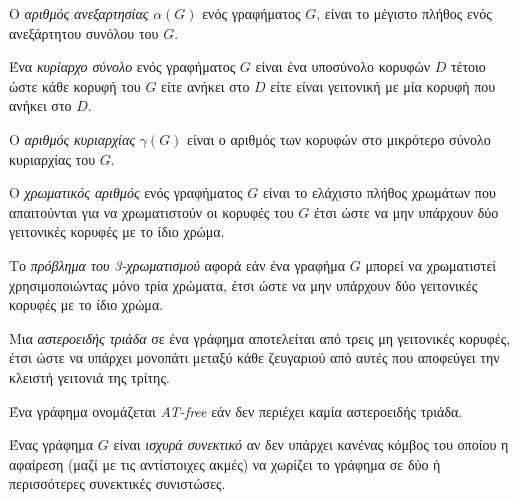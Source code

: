 \begin{definition}
	Ο \textit{αριθμός ανεξαρτησίας} $\alpha(G)$ ενός γραφήματος $G$, είναι το μέγιστο πλήθος ενός ανεξάρτητου συνόλου του $G$.
\end{definition}

\begin{definition}
	Ένα \textit{κυρίαρχο σύνολο} ενός γραφήματος $G$ είναι ένα υποσύνολο κορυφών $D$ τέτοιο ώστε κάθε κορυφή του $G$ είτε ανήκει στο $D$ είτε είναι γειτονική με μία κορυφή που ανήκει στο $D$.
\end{definition}

\begin{definition}
	Ο \textit{αριθμός κυριαρχίας} $\gamma(G)$ είναι ο αριθμός των κορυφών στο μικρότερο σύνολο κυριαρχίας του $G$.
\end{definition}

\begin{definition}
	Ο \textit{χρωματικός αριθμός} ενός γραφήματος $G$ είναι το ελάχιστο πλήθος χρωμάτων που απαιτούνται για να χρωματιστούν οι κορυφές του $G$ έτσι ώστε να μην υπάρχουν δύο γειτονικές κορυφές με το ίδιο χρώμα.
\end{definition}

\begin{definition}
	Το \textit{πρόβλημα του 3-χρωματισμού} αφορά εάν ένα γραφήμα $G$ μπορεί να χρωματιστεί χρησιμοποιώντας μόνο τρία χρώματα, έτσι ώστε να μην υπάρχουν δύο γειτονικές κορυφές με το ίδιο χρώμα.
\end{definition}

\begin{definition}
	Μια \textit{αστεροειδής τριάδα} σε ένα γράφημα αποτελείται από τρεις μη γειτονικές κορυφές, έτσι ώστε να υπάρχει μονοπάτι μεταξύ κάθε ζευγαριού από αυτές που αποφεύγει την κλειστή γειτονιά της τρίτης. 
\end{definition}

\begin{definition}
	Ένα γράφημα ονομάζεται \textit{AT-free} εάν δεν περιέχει καμία αστεροειδής τριάδα.
\end{definition}

\begin{definition}
	Ένας γράφημα $G$ είναι  \textit{ισχυρά συνεκτικό} αν δεν υπάρχει κανένας κόμβος του οποίου η αφαίρεση (μαζί με τις αντίστοιχες ακμές) να χωρίζει το γράφημα σε δύο ή περισσότερες συνεκτικές συνιστώσες.
\end{definition}




